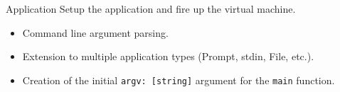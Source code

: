 \begin{slide}
    \begin{block}{Application}
        Setup the application and fire up the virtual machine.
    \end{block}
    \vfill
    \begin{itemize}
        \item Command line argument parsing.
        \item Extension to multiple application types (Prompt, stdin, File, etc.).
        \item Creation of the initial \texttt{argv: [string]} argument for the \texttt{main} function.
    \end{itemize}
\end{slide}
